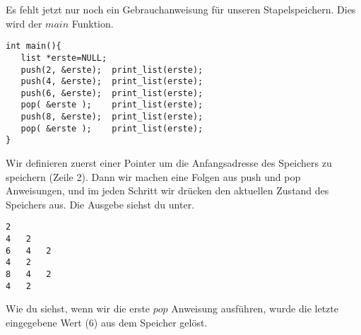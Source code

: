 Es fehlt jetzt nur noch ein Gebrauchanweisung für unseren Stapelspeichern.
Dies wird der $main$ Funktion.
\begin{lstlisting}
int main(){
   list *erste=NULL;
   push(2, &erste);  print_list(erste);
   push(4, &erste);  print_list(erste);
   push(6, &erste);  print_list(erste);
   pop( &erste );    print_list(erste);
   push(8, &erste);  print_list(erste);
   pop( &erste );    print_list(erste);
}
\end{lstlisting}
Wir definieren zuerst einer Pointer um die 
Anfangsadresse des Speichers zu speichern (Zeile 2). Dann wir machen eine
Folgen aus push und pop Anweisungen, und im jeden Schritt wir drücken
den aktuellen Zustand des Speichers aus. Die Ausgebe siehst du unter.
\begin{lstlisting}
2	
4	2	
6	4	2	
4	2	
8	4	2	
4	2	
\end{lstlisting}
Wie du siehst, wenn wir die erste $pop$ Anweisung ausführen, wurde die letzte 
eingegebene Wert (6) aus dem Speicher gelöst. 

